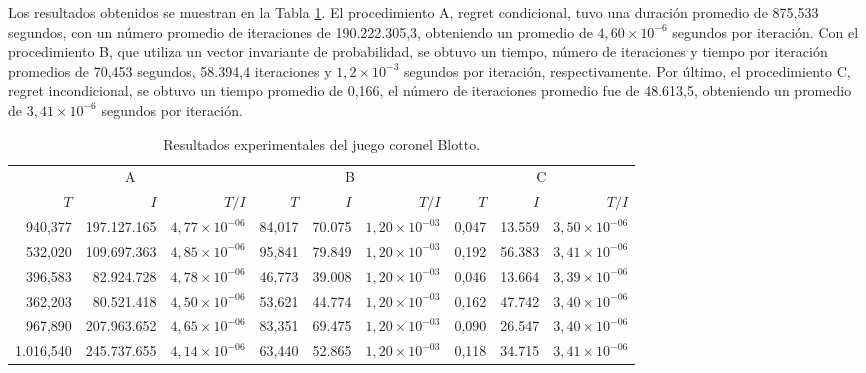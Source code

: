 Los resultados obtenidos se muestran en la Tabla \ref{tab:resultados-coronel-blotto}.  El procedimiento A, regret condicional, tuvo una duración promedio de 875,533 segundos, con un número promedio de iteraciones de 190.222.305,3, obteniendo un promedio de $4,60 {\times} 10^{-6}$ segundos por iteración. Con el procedimiento B, que utiliza un vector invariante de probabilidad, se obtuvo un tiempo, número de iteraciones y tiempo por iteración promedios de 70,453 segundos, 58.394,4 iteraciones y $1,2 {\times} 10^{-3}$ segundos por iteración, respectivamente. Por último, el procedimiento C, regret incondicional, se obtuvo un tiempo promedio de 0,166, el número de iteraciones promedio fue de 48.613,5, obteniendo un promedio de $3,41 {\times} 10^{-6}$ segundos por iteración.

\begin{table}[h]
    \centering
    \caption{Resultados experimentales del juego coronel Blotto.}
    \label{tab:resultados-coronel-blotto}
    \scriptsize
    \begin{tabular}{r r r r r r r r r}
    \toprule
    \multicolumn{3}{c}{A} & \multicolumn{3}{c}{B} & \multicolumn{3}{c}{C} \\ \cmidrule(r){1-3} \cmidrule(lr){4-6} \cmidrule(l){7-9}
    $T$ & $I$ & $T/I$ & $T$ & $I$ & $T/I$ & $T$ & $I$ & $T/I$ \\  \cmidrule(r){1-3} \cmidrule(lr){4-6} \cmidrule(l){7-9}
      940,377 & 197.127.165   & $4,77 {\times} 10^{-06}$ & 84,017 & 70.075   & $1,20 {\times} 10^{-03}$ & 0,047 &  13.559   & $3,50 {\times} 10^{-06}$ \\
      532,020 & 109.697.363   & $4,85 {\times} 10^{-06}$ & 95,841 & 79.849   & $1,20 {\times} 10^{-03}$ & 0,192 &  56.383   & $3,41 {\times} 10^{-06}$ \\
      396,583 &  82.924.728   & $4,78 {\times} 10^{-06}$ & 46,773 & 39.008   & $1,20 {\times} 10^{-03}$ & 0,046 &  13.664   & $3,39 {\times} 10^{-06}$ \\
      362,203 &  80.521.418   & $4,50 {\times} 10^{-06}$ & 53,621 & 44.774   & $1,20 {\times} 10^{-03}$ & 0,162 &  47.742   & $3,40 {\times} 10^{-06}$ \\
      967,890 & 207.963.652   & $4,65 {\times} 10^{-06}$ & 83,351 & 69.475   & $1,20 {\times} 10^{-03}$ & 0,090 &  26.547   & $3,40 {\times} 10^{-06}$ \\
    1.016,540 & 245.737.655   & $4,14 {\times} 10^{-06}$ & 63,440 & 52.865   & $1,20 {\times} 10^{-03}$ & 0,118 &  34.715   & $3,41 {\times} 10^{-06}$ \\

\end{tabular}
\end{table}
